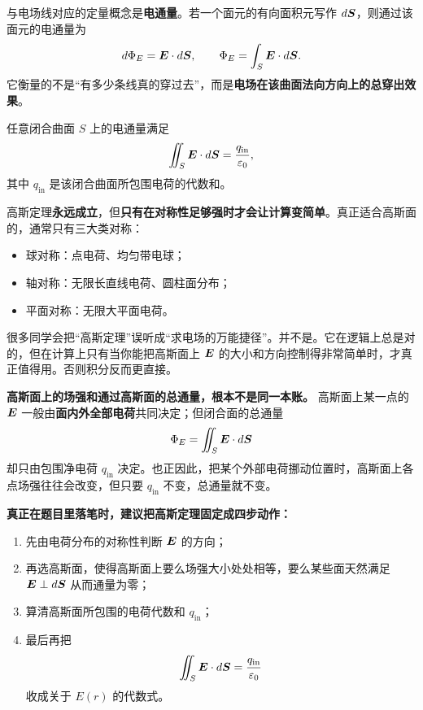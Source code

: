 \documentclass[lang=cn,11pt]{elegantbook}
\begin{document}
与电场线对应的定量概念是\textbf{电通量}。若一个面元的有向面积元写作 \(d\vb*{S}\)，则通过该面元的电通量为
\[
d\Phi_E=\vb*{E}\cdot d\vb*{S},
\qquad
\Phi_E=\int_S \vb*{E}\cdot d\vb*{S}.
\]
它衡量的不是“有多少条线真的穿过去”，而是\textbf{电场在该曲面法向方向上的总穿出效果}。

\begin{theorem}[高斯定理]
任意闭合曲面 \(S\) 上的电通量满足
\[
\iint_S \vb*{E}\cdot d\vb*{S}
=\frac{q_{\mathrm{in}}}{\varepsilon_0},
\]
其中 \(q_{\mathrm{in}}\) 是该闭合曲面所包围电荷的代数和。
\end{theorem}

\begin{center}
\end{center}

高斯定理\textbf{永远成立}，但\textbf{只有在对称性足够强时才会让计算变简单}。真正适合高斯面的，通常只有三大类对称：
\begin{itemize}
  \item 球对称：点电荷、均匀带电球；
  \item 轴对称：无限长直线电荷、圆柱面分布；
  \item 平面对称：无限大平面电荷。
\end{itemize}

\begin{remark}
很多同学会把“高斯定理”误听成“求电场的万能捷径”。并不是。它在逻辑上总是对的，但在计算上只有当你能把高斯面上 \(\vb*{E}\) 的大小和方向控制得非常简单时，才真正值得用。否则积分反而更直接。
\end{remark}

\begin{remark}
\textbf{高斯面上的场强和通过高斯面的总通量，根本不是同一本账。} 高斯面上某一点的 \(\vb*{E}\) 一般由\textbf{面内外全部电荷}共同决定；但闭合面的总通量
\[
\Phi_E=\iint_S \vb*{E}\cdot d\vb*{S}
\]
却只由包围净电荷 \(q_{\mathrm{in}}\) 决定。也正因此，把某个外部电荷挪动位置时，高斯面上各点场强往往会改变，但只要 \(q_{\mathrm{in}}\) 不变，总通量就不变。
\end{remark}

\begin{note}
\textbf{真正在题目里落笔时，建议把高斯定理固定成四步动作：}
\begin{enumerate}
  \item 先由电荷分布的对称性判断 \(\vb*{E}\) 的方向；
  \item 再选高斯面，使得高斯面上要么场强大小处处相等，要么某些面天然满足 \(\vb*{E}\perp d\vb*{S}\) 从而通量为零；
  \item 算清高斯面所包围的电荷代数和 \(q_{\mathrm{in}}\)；
  \item 最后再把
  \[
  \iint_S \vb*{E}\cdot d\vb*{S}=\frac{q_{\mathrm{in}}}{\varepsilon_0}
  \]
  收成关于 \(E(r)\) 的代数式。
\end{enumerate}
\end{note}
\end{document}
